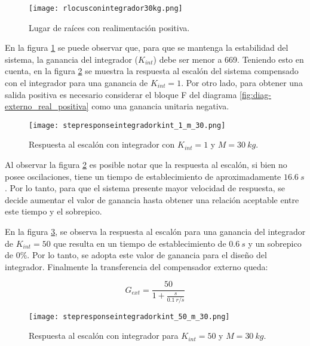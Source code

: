 \begin{figure}[H]
	\centering
	\texttt{[image: rlocusconintegrador30kg.png]}
	\caption{Lugar de raíces con realimentación positiva.}
	\label{fig:lugar-de-raices-con-integrador-analog}
\end{figure}
 
\noindent En la figura \ref{fig:lugar-de-raices-con-integrador-analog} se puede observar que, para que se mantenga la estabilidad del sistema, la ganancia del integrador ($K_{int}$) debe ser menor a 669. Teniendo esto en cuenta, en la figura \ref{fig:respuesta-al-escalon-con-k-1-M-30-analog} se muestra la respuesta al escalón del sistema compensado con el integrador para una ganancia de $K_{int}=1$. Por otro lado, para obtener una salida positiva es necesario considerar el bloque F del diagrama \ref{fig:diag-externo_real_positiva} como una ganancia unitaria negativa.

\begin{figure}[H]
	\centering
	\texttt{[image: stepresponseintegradorkint\_1\_m\_30.png]}
	\caption{Respuesta al escalón con integrador con $K_{int} =1$ y $M=30\:kg$.}
	\label{fig:respuesta-al-escalon-con-k-1-M-30-analog}
\end{figure}

Al observar la figura \ref{fig:respuesta-al-escalon-con-k-1-M-30-analog} es posible notar que la respuesta al escalón, si bien no posee oscilaciones, tiene un tiempo de establecimiento de aproximadamente $16.6 \:s$. Por lo tanto, para que el sistema presente mayor velocidad de respuesta, se decide aumentar el valor de ganancia hasta obtener una relación aceptable entre este tiempo y el sobrepico.



\noindent En la figura \ref{fig:respuesta-al-escalon-con-k-50-M-30}, se observa la respuesta al escalón para una ganancia del integrador de $K_{int}=50$ que resulta en un tiempo de establecimiento de $0.6\:s$ y un sobrepico de 0\%. Por lo tanto, se adopta este valor de ganancia para el diseño del integrador. Finalmente la transferencia del compensador externo queda:

\begin{equation} \label{eq_gexterno}
	G_{ext}=\frac{50}{1+\frac{s}{0.1\:r/s}}	
\end{equation}

\begin{figure}[H]
	\centering
	\texttt{[image: stepresponseintegradorkint\_50\_m\_30.png]}
	\caption{Respuesta al escalón con integrador para $K_{int}=50$ y $M = 30\:kg$.}
	\label{fig:respuesta-al-escalon-con-k-50-M-30}
\end{figure}

